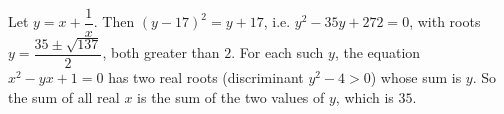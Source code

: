 Let $y=x+\dfrac{1}{x}$. Then $(y-17)^2=y+17$, i.e. $y^2-35y+272=0$, with roots $y=\dfrac{35\pm\sqrt{137}}{2}$, both greater than $2$. For each such $y$, the equation $x^2-yx+1=0$ has two real roots (discriminant $y^2-4>0$) whose sum is $y$. So the sum of all real $x$ is the sum of the two values of $y$, which is $\boxed{35}$.
